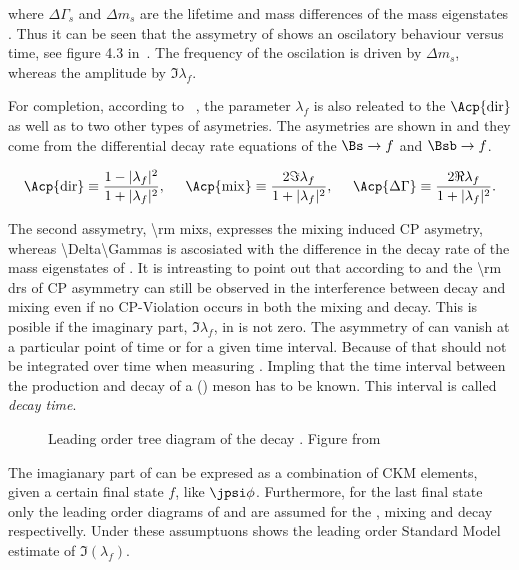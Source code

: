 \noindent where $\Delta\Gamma_s$ and $\Delta m_s$ are the lifetime and mass differences of the mass eigenstates .
Thus it can be seen that the assymetry of  shows an oscilatory behaviour versus time, see figure 4.3 in~\cite{jeroenThesis}.
The frequency of the oscilation is driven by $\Delta m_s$, whereas the amplitude by $\Im\lambda_f$.

For completion, according to ~\cite{DeBruyn-thesis,jeroenThesis}, the parameter $\lambda_f$ is also releated to the $\Acp{\rm dir}$ as well as to two
other types of asymetries. The asymetries are shown in  and they come from the differential decay rate equations of the $\Bs\to f$
 and $\Bsb\to f$.

\begin{equation}
  \Acp{\rm dir}      \equiv \frac{ 1-|\lambda_f|^2} {1 + |\lambda_f|^2},\;\;\;\;\;
  \Acp{\rm mix}      \equiv \frac{ 2 \Im\lambda_f} {1 + |\lambda_f|^2},\;\;\;\;\;
  \Acp{\Delta\Gamma} \equiv \frac{ 2 \Re\lambda_f} {1 + |\lambda_f|^2}.
\label{cp_asym_lambda}
\end{equation}

The second assymetry, \Acp{\rm mix}, expresses the mixing induced CP asymetry, whereas \Acp{\Delta\Gamma} is ascosiated with the
difference in the decay rate of the mass eigenstates of . It is intreasting to point out that according
to  and the \Acp{\rm dr} of  CP asymmetry can still be observed in the interference between decay and
mixing even if no CP-Violation occurs in both the mixing and decay. This is posible if the imaginary part, $\Im\lambda_f$, in  is not zero.
The asymmetry of  can vanish at a particular point of time or for a given time interval. Because of that  should not
be integrated over time when measuring \phis. Impling that the time interval between the production and decay of a \Bs (\Bsb) meson has to be
known. This interval is called {\it decay time}.

\begin{figure}[h]
  \centering
  {\sffamily }
  \caption{Leading order tree diagram of the decay \BsJpsiPhi. Figure from~\cite{jeroenThesis}}
  \label{bs2jpsiphi}
\end{figure}

The imagianary part of  can be expresed as a combination of CKM elements, given a certain final state $f$, like $\jpsi\phi$.
Furthermore, for the last final state only the leading order diagrams of  and  are assumed for the \Bs, \Bsb
mixing and decay respectivelly. Under these assumptuons  shows the leading order Standard Model estimate of $\Im(\lambda_f)$.

